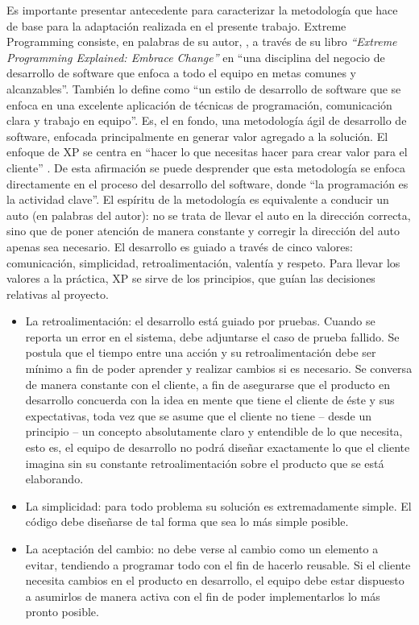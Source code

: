 Es importante presentar antecedente para caracterizar la metodología que hace de base para la adaptación realizada en el presente trabajo. Extreme Programming consiste, en palabras de su autor, \cite{Beck1999}, a través de su libro \textit{``Extreme Programming Explained: Embrace Change''} en ``una disciplina del negocio de desarrollo de software que enfoca a todo el equipo en metas comunes y alcanzables''. También lo define como ``un estilo de desarrollo de software que se enfoca en una excelente aplicación de técnicas de programación, comunicación clara y trabajo en equipo''. Es, el en fondo, una metodología ágil de desarrollo de software, enfocada principalmente en generar valor agregado a la solución.
El enfoque de XP se centra en ``hacer lo que necesitas hacer para crear valor para el cliente'' \citep{Beck1999}. De esta afirmación se puede desprender que esta metodología se enfoca directamente en el proceso del desarrollo del software, donde ``la programación es la actividad clave''. El espíritu de la metodología es equivalente a conducir un auto (en palabras del autor): no se trata de llevar el auto en la dirección correcta, sino que de poner atención de manera constante y corregir la dirección del auto apenas sea necesario. El desarrollo es guiado a través de cinco valores: comunicación, simplicidad, retroalimentación, valentía y respeto. Para llevar los valores a la práctica, XP se sirve de los principios, que guían las decisiones relativas al proyecto.
\begin{itemize}
\item La retroalimentación: el desarrollo está guiado por pruebas. Cuando se reporta un error en el sistema, debe adjuntarse el caso de prueba fallido. Se postula que el tiempo entre una acción y su retroalimentación debe ser mínimo a fin de poder aprender y realizar cambios si es necesario. Se conversa de manera constante con el cliente, a fin de asegurarse que el producto en desarrollo concuerda con la idea en mente que tiene el cliente de éste y sus expectativas, toda vez que se asume que el cliente no tiene – desde un principio – un concepto absolutamente claro y entendible de lo que necesita, esto es, el equipo de desarrollo no podrá diseñar exactamente lo que el cliente imagina sin su constante retroalimentación sobre el producto que se está elaborando.
\item La simplicidad: para todo problema su solución es extremadamente simple. El código debe diseñarse de tal forma que sea lo más simple posible.
\item La aceptación del cambio: no debe verse al cambio como un elemento a evitar, tendiendo a programar todo con el fin de hacerlo reusable. Si el cliente necesita cambios en el producto en desarrollo, el equipo debe estar dispuesto a asumirlos de manera activa con el fin de poder implementarlos lo más pronto posible.
\end{itemize}
 
